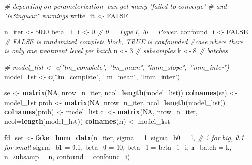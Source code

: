 \documentclass[]{book}
\newenvironment{Shaded}{\begin{snugshade}}{\end{snugshade}}
\newcommand{\CommentTok}[1]{\textcolor[rgb]{0.56,0.35,0.01}{\textit{#1}}}
\newcommand{\DataTypeTok}[1]{\textcolor[rgb]{0.13,0.29,0.53}{#1}}
\newcommand{\DecValTok}[1]{\textcolor[rgb]{0.00,0.00,0.81}{#1}}
\newcommand{\FloatTok}[1]{\textcolor[rgb]{0.00,0.00,0.81}{#1}}
\newcommand{\KeywordTok}[1]{\textcolor[rgb]{0.13,0.29,0.53}{\textbf{#1}}}
\newcommand{\NormalTok}[1]{#1}
\newcommand{\OtherTok}[1]{\textcolor[rgb]{0.56,0.35,0.01}{#1}}
\newcommand{\StringTok}[1]{\textcolor[rgb]{0.31,0.60,0.02}{#1}}
\begin{document}
\begin{Shaded}
\begin{Highlighting}[]
\CommentTok{# depending on parameterization, can get many "failed to converge"}
\CommentTok{# and "isSingular" warnings}
\NormalTok{write_it <-}\StringTok{ }\OtherTok{FALSE}

\NormalTok{n_iter <-}\StringTok{ }\DecValTok{5000}
\NormalTok{beta_}\DecValTok{1}\NormalTok{_i <-}\StringTok{ }\DecValTok{0}  \CommentTok{# 0 = Type I, !0 = Power.}
\NormalTok{confound_i <-}\StringTok{ }\OtherTok{FALSE} \CommentTok{# FALSE is randomized complete block, TRUE is confounded}
 \CommentTok{#case where there is only one treatment level per batch}
\NormalTok{n <-}\StringTok{ }\DecValTok{3} \CommentTok{# subsamples}
\NormalTok{k <-}\StringTok{ }\DecValTok{8} \CommentTok{# batches}

\CommentTok{# model_list <- c("lm_complete", "lm_mean", "lmm_slope", "lmm_inter")}
\NormalTok{model_list <-}\StringTok{ }\KeywordTok{c}\NormalTok{(}\StringTok{"lm_complete"}\NormalTok{, }\StringTok{"lm_mean"}\NormalTok{, }\StringTok{"lmm_inter"}\NormalTok{)}

\NormalTok{se <-}\StringTok{ }\KeywordTok{matrix}\NormalTok{(}\OtherTok{NA}\NormalTok{, }\DataTypeTok{nrow=}\NormalTok{n_iter, }\DataTypeTok{ncol=}\KeywordTok{length}\NormalTok{(model_list))}
\KeywordTok{colnames}\NormalTok{(se) <-}\StringTok{ }\NormalTok{model_list}
\NormalTok{prob <-}\StringTok{ }\KeywordTok{matrix}\NormalTok{(}\OtherTok{NA}\NormalTok{, }\DataTypeTok{nrow=}\NormalTok{n_iter, }\DataTypeTok{ncol=}\KeywordTok{length}\NormalTok{(model_list))}
\KeywordTok{colnames}\NormalTok{(prob) <-}\StringTok{ }\NormalTok{model_list}
\NormalTok{ci <-}\StringTok{ }\KeywordTok{matrix}\NormalTok{(}\OtherTok{NA}\NormalTok{, }\DataTypeTok{nrow=}\NormalTok{n_iter, }\DataTypeTok{ncol=}\KeywordTok{length}\NormalTok{(model_list))}
\KeywordTok{colnames}\NormalTok{(ci) <-}\StringTok{ }\NormalTok{model_list}

\NormalTok{fd_set <-}\StringTok{ }\KeywordTok{fake_lmm_data}\NormalTok{(n_iter, }
                        \DataTypeTok{sigma =} \DecValTok{1}\NormalTok{, }
                        \DataTypeTok{sigma_b0 =} \DecValTok{1}\NormalTok{, }\CommentTok{# 1 for big, 0.1 for small}
                        \DataTypeTok{sigma_b1 =} \FloatTok{0.1}\NormalTok{, }
                        \DataTypeTok{beta_0 =} \DecValTok{10}\NormalTok{,}
                        \DataTypeTok{beta_1 =}\NormalTok{ beta_}\DecValTok{1}\NormalTok{_i, }
                        \DataTypeTok{n_batch =}\NormalTok{ k, }
                        \DataTypeTok{n_subsamp =}\NormalTok{ n, }
                        \DataTypeTok{confound =}\NormalTok{ confound_i)}


\end{Highlighting}
\end{Shaded}
\end{document}
